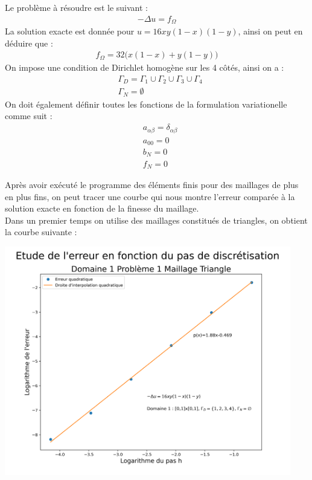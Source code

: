 \documentclass[a4paper, 12pt, french]{report}
\begin{document}
Le problème à résoudre est le suivant : 
\begin{align*}
    -\Delta u = f_\Omega
\end{align*}
La solution exacte est donnée pour $u=16xy(1-x)(1-y)$, ainsi on peut en déduire que :
\begin{align*}
    f_\Omega = 32\big( x(1-x) + y(1-y) \big)
\end{align*}
On impose une condition de Dirichlet homogène sur les 4 côtés, ainsi on a : 
\begin{align*}
    &\Gamma_D = \Gamma_1 \cup\Gamma_2 \cup\Gamma_3 \cup\Gamma_4 \\
    &\Gamma_N = \emptyset
\end{align*}
On doit également définir toutes les fonctions de la formulation variationelle comme suit : 
\begin{align*}
    &a_{\alpha\beta} = \delta_{\alpha\beta}\\
    &a_{00} = 0\\
    &b_N = 0\\
    &f_N = 0
\end{align*}

Après avoir exécuté le programme des éléments finis pour des maillages de plus en plus fins, on peut tracer une courbe qui nous montre l'erreur comparée à la solution exacte en fonction de la finesse du maillage.\\
Dans un premier temps on utilise des maillages constitués de triangles, on obtient la courbe suivante :

\begin{center}
    \includegraphics[height=10cm]{../Images/Courbes_Erreurs/D1P1T.png}
\end{center}
\end{document}
